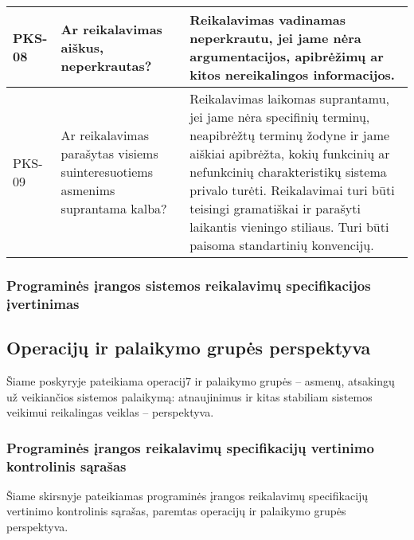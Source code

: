 \documentclass{VUMIFPSkursinis}
\begin{document}
\begin{center}
\begin{longtable}{|C{2cm}|L{5cm}|L{8cm}|}
		PKS-08                                                                        &
		Ar reikalavimas aiškus, neperkrautas?                                         &
		Reikalavimas vadinamas neperkrautu, jei jame nėra argumentacijos, apibrėžimų ar kitos nereikalingos informacijos.                                                                                                                                                                                                                                                                                                                             \\ \hline
		PKS-09                                                                        &
		Ar reikalavimas parašytas visiems suinteresuotiems asmenims suprantama kalba? &
		Reikalavimas laikomas suprantamu, jei jame nėra specifinių terminų, neapibrėžtų terminų žodyne ir jame aiškiai apibrėžta, kokių funkcinių ar nefunkcinių charakteristikų sistema privalo turėti. Reikalavimai turi būti teisingi gramatiškai ir parašyti laikantis vieningo stiliaus. Turi būti paisoma standartinių konvencijų.                                                                                                              \\ \hline
	\end{longtable}
\end{center}

\subsubsection{Programinės įrangos sistemos reikalavimų specifikacijos įvertinimas}

\subsection{Operacijų ir palaikymo grupės perspektyva}

Šiame poskyryje pateikiama operacij7 ir palaikymo grupės -- asmenų, atsakingų už veikiančios
sistemos palaikymą: atnaujinimus ir kitas stabiliam sistemos veikimui reikalingas veiklas -- perspektyva.

\subsubsection{Programinės įrangos reikalavimų specifikacijų vertinimo kontrolinis sąrašas}

Šiame skirsnyje pateikiamas programinės įrangos reikalavimų specifikacijų vertinimo kontrolinis sąrašas,
paremtas operacijų ir palaikymo grupės perspektyva.
\end{document}
